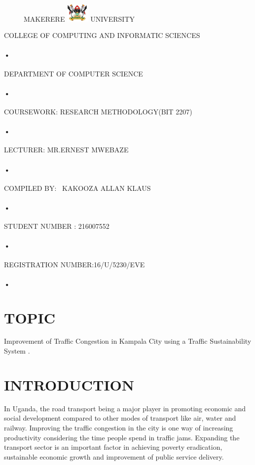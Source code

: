 \documentclass[11pt,A4paper]{article}
\begin{document}
\begin{titlepage}
  \begin{figure}[h]
  \centerline{\small MAKERERE 
  \includegraphics[width=0.1\textwidth]{muk_log} UNIVERSITY}
\end{figure}
\centerline{COLLEGE OF COMPUTING AND INFORMATIC SCIENCES}
\paragraph{•}
\centerline{DEPARTMENT OF COMPUTER SCIENCE\\}
\paragraph{•}

\centerline{COURSEWORK: RESEARCH METHODOLOGY(BIT 2207)\\}
\paragraph{•}

\centerline{LECTURER: MR.ERNEST MWEBAZE}

\paragraph{•}
\centerline{COMPILED BY: \
 KAKOOZA ALLAN KLAUS}
\paragraph{•}
\centerline{STUDENT NUMBER : 216007552}
\paragraph{•}
\centerline{REGISTRATION NUMBER:16/U/5230/EVE}
\paragraph{•}
\end{titlepage}
\tableofcontents
\newpage
{}
\section{TOPIC}
Improvement of Traffic Congestion
in Kampala City using a Traffic Sustainability System .
\section{INTRODUCTION}
In Uganda, the road transport being a major player
in promoting economic and social development
compared to other modes of transport like
air, water and railway. Improving the traffic congestion
in the city is one way of increasing productivity
considering the time people spend in
traffic jams. Expanding the transport sector is an
important factor in achieving poverty eradication,
sustainable economic growth and improvement
of public service delivery.
\end{document}
